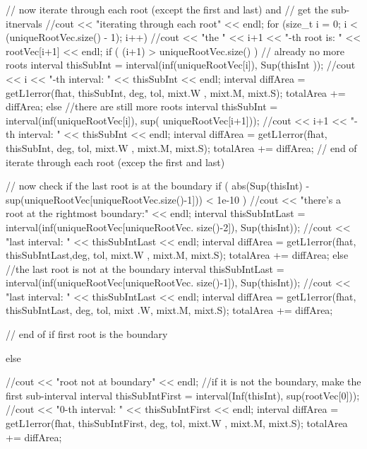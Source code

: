 \begin{DoxyCode}
{{{{{          // now iterate through each root (except the first and last) and 
          // get the sub-itnervals
          //cout << "iterating through each root" << endl;
          for (size_t i = 0; i < (uniqueRootVec.size() - 1); i++) {
            //cout << "the " << i+1 << "-th root is: " << rootVec[i+1] << endl;
            if ( (i+1) > uniqueRootVec.size() ) { // already no more roots
              interval thisSubInt = interval(inf(uniqueRootVec[i]), Sup(thisInt
      ));
              //cout << i << "-th interval: " << thisSubInt << endl;
              interval diffArea = getL1error(fhat, thisSubInt, deg, tol, mixt.W
      , mixt.M, mixt.S);
              totalArea += diffArea;
            }
            else { //there are still more roots
              interval thisSubInt = interval(inf(uniqueRootVec[i]), sup(
      uniqueRootVec[i+1]));
              //cout << i+1 << "-th interval: " << thisSubInt << endl;
              interval diffArea = getL1error(fhat, thisSubInt, deg, tol, mixt.W
      , mixt.M, mixt.S);
              totalArea += diffArea;
            }
          } // end of iterate through each root (excep the first and last)
          
          // now check if the last root is at the boundary
          if ( abs(Sup(thisInt) - sup(uniqueRootVec[uniqueRootVec.size()-1])) <
       1e-10 ) {
            //cout << "there's a root at the rightmost boundary:" << endl;
            interval thisSubIntLast = interval(inf(uniqueRootVec[uniqueRootVec.
      size()-2]), Sup(thisInt));
            //cout << "last interval: " << thisSubIntLast << endl; 
            interval diffArea = getL1error(fhat, thisSubIntLast,deg, tol, mixt.W
      , mixt.M, mixt.S);
            totalArea += diffArea;
          }
          else { //the last root is not at the boundary
            interval thisSubIntLast = interval(inf(uniqueRootVec[uniqueRootVec.
      size()-1]), Sup(thisInt));
            //cout << "last interval: " << thisSubIntLast << endl; 
            interval diffArea = getL1error(fhat, thisSubIntLast, deg, tol, mixt
      .W, mixt.M, mixt.S);
            totalArea += diffArea;
          } 
        } // end of if first root is the boundary
        
        else {
          //cout << "root not at boundary" << endl;
          //if it is not the boundary, make the first sub-interval
          interval thisSubIntFirst = interval(Inf(thisInt), sup(rootVec[0]));
          //cout << "0-th interval: " << thisSubIntFirst << endl; 
          interval diffArea = getL1error(fhat, thisSubIntFirst, deg, tol, mixt.W
      , mixt.M, mixt.S);
          totalArea += diffArea;
          
}}}}}
\end{DoxyCode}
